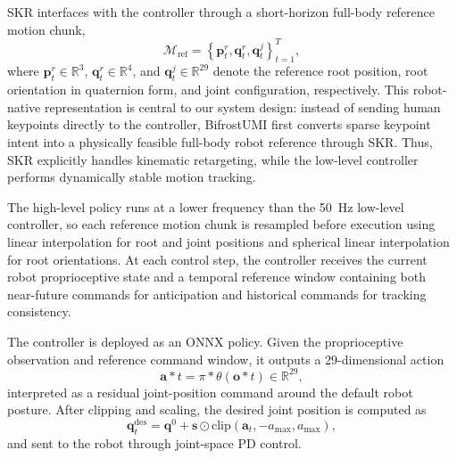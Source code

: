 \documentclass[letterpaper, 10 pt, conference]{ieeeconf}  %
\begin{document}
SKR interfaces with the controller through a short-horizon full-body reference motion chunk,
\begin{equation}
\mathcal{M}_{\mathrm{ref}} =
\left\{
\mathbf{p}^{r}_{t},
\mathbf{q}^{r}_{t},
\mathbf{q}^{j}_{t}
\right\}_{t=1}^{T},
\end{equation}
where $\mathbf{p}^{r}_{t} \in \mathbb{R}^{3}$, $\mathbf{q}^{r}_{t} \in \mathbb{R}^{4}$, and $\mathbf{q}^{j}_{t} \in \mathbb{R}^{29}$ denote the reference root position, root orientation in quaternion form, and joint configuration, respectively. This robot-native representation is central to our system design: instead of sending human keypoints directly to the controller, BifrostUMI first converts sparse keypoint intent into a physically feasible full-body robot reference through SKR. Thus, SKR explicitly handles kinematic retargeting, while the low-level controller performs dynamically stable motion tracking.

The high-level policy runs at a lower frequency than the 50~Hz low-level controller, so each reference motion chunk is resampled before execution using linear interpolation for root and joint positions and spherical linear interpolation for root orientations. At each control step, the controller receives the current robot proprioceptive state and a temporal reference window containing both near-future commands for anticipation and historical commands for tracking consistency.

The controller is deployed as an ONNX policy. Given the proprioceptive observation and reference command window, it outputs a 29-dimensional action
\begin{equation}
\mathbf{a}*{t} = \pi*{\theta}(\mathbf{o}*{t}) \in \mathbb{R}^{29},
\end{equation}
interpreted as a residual joint-position command around the default robot posture. After clipping and scaling, the desired joint position is computed as
\begin{equation}
\mathbf{q}^{\mathrm{des}}_{t}
=
\mathbf{q}^{0}
+
\mathbf{s} \odot
\mathrm{clip}
\left(
\mathbf{a}_{t}, -a_{\max}, a_{\max}
\right),
\end{equation}
and sent to the robot through joint-space PD control.


\end{document}
